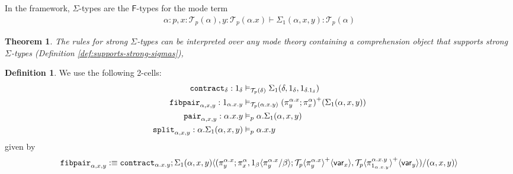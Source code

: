 \documentclass[10pt]{article}
\newtheorem{theorem}{Theorem}
\theoremstyle{definition}
\newtheorem{definition}{Definition}
\newcommand{\yields}{\vdash}
\newcommand\TrPlus[2]{\ensuremath{{#1}^+(#2)}}
\newcommand\El[2]{\mathcal{T}_{#1}(#2)}
\newcommand\ApEl[2]{\mathcal{T}_{#1}\langle#2\rangle}
\newcommand\ap[2]{\ensuremath{#1 \langle #2 \rangle }}
\newcommand\ApPlus[2]{\ensuremath{{#1}^+ \langle #2 \rangle }}
\begin{document}
In the framework, $\Sigma$-types are the $\mathsf{F}$-types for the mode term
\begin{align*}
\alpha : p, x : \El{p}{\alpha}, y : \El{p}{\alpha.x} \yields \Sigma_1(\alpha,x,y) : \El{p}{\alpha}
\end{align*}

\begin{theorem}
The rules for strong $\Sigma$-types can be interpreted over any mode theory containing a comprehension object that supports strong $\Sigma$-types (Definition \ref{def:supports-strong-sigmas}), 
\end{theorem}

\begin{definition}
We use the following 2-cells:
\begin{align*}
\contract{\delta} : 1_\delta &\vDash_{\El{p}{\delta}} \Sigma_1(\delta, 1_\delta, 1_{\delta.1_\delta}) \\
\fibpair{\alpha,x,y} : 1_{\alpha.x.y} &\vDash_{\El{p}{\alpha.x.y}} \TrPlus{(\pi^{\alpha.x}_y;\pi^\alpha_x)}{\Sigma_1(\alpha,x,y)} \\
\pair{\alpha,x,y} : \alpha.x.y &\vDash_{p} \alpha.\Sigma_1(\alpha,x,y) \\
\tsplit{\alpha,x,y} : \alpha.\Sigma_1(\alpha,x,y) &\vDash_{p} \alpha.x.y
\end{align*}
given by 
\begin{align*}
\fibpair{\alpha,x,y} :\equiv \contract{\alpha.x.y};\ap{\Sigma_1(\alpha,x,y)}{(\pi^{\alpha.x}_y;\pi^{\alpha}_x,\ap{1_\beta}{\pi^{\alpha.x}_y/\beta};\ApPlus{\ApEl{p}{\pi^{\alpha.x}_y}}{\var{x}}, \ApPlus{\ApEl{p}{\pi^{\alpha.x.y}_{1_{\alpha.x.y}}}}{\var{y}})/(\alpha,x,y)}
\end{align*}
\end{definition}

\end{document}
